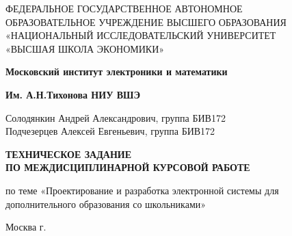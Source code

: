 \begin{titlepage}
	\begin{center}
		ФЕДЕРАЛЬНОЕ  ГОСУДАРСТВЕННОЕ АВТОНОМНОЕ \\
		ОБРАЗОВАТЕЛЬНОЕ УЧРЕЖДЕНИЕ ВЫСШЕГО ОБРАЗОВАНИЯ\\
		«НАЦИОНАЛЬНЫЙ ИССЛЕДОВАТЕЛЬСКИЙ УНИВЕРСИТЕТ\\
		«ВЫСШАЯ ШКОЛА ЭКОНОМИКИ»
	\end{center}
	
	\begin{center}
		\textbf{Московский институт электроники и математики}
		
		\textbf{Им. А.Н.Тихонова НИУ ВШЭ}
	\end{center}
	\vspace{1ex}	
	\begin{center}
		Солодянкин Андрей Александрович, группа БИВ172\\
		Подчезерцев Алексей Евгеньевич, группа БИВ172
	\end{center}	
	\vspace{1ex}
	\begin{center}
		\textbf{ТЕХНИЧЕСКОЕ ЗАДАНИЕ\\
		ПО МЕЖДИСЦИПЛИНАРНОЙ КУРСОВОЙ РАБОТЕ
	}
	\end{center}	
	\vspace{2ex}
	\begin{center}
		по теме «Проектирование и разработка электронной системы для дополнительного образования со школьниками»\\
	\end{center}
	\vspace{2ex}
	\begin{center}
	\end{center}
	\vspace{2ex}
	\vfill
	\begin{center}
		Москва \the\year г.
	\end{center}
\end{titlepage}